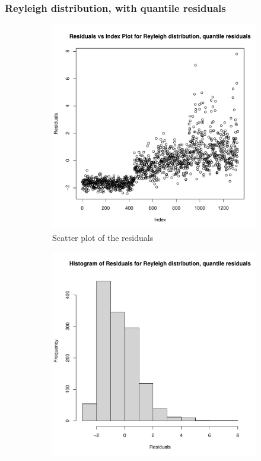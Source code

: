 \documentclass[12pt,a4paper,twoside]{article}
\begin{document}
\subsubsection{Reyleigh distribution, with quantile residuals}
\label{sssec:reyleighquantile}
\begin{figure}[!ht]
    \begin{subfigure}{.45\textwidth}
        \centering
        \includegraphics[width=\linewidth]{img/reyleigh_residuals_quantile.pdf}
        \caption{Scatter plot of the residuals}
        \label{fig:reyleighquantilescatter}
    \end{subfigure}
    \begin{subfigure}{.45\textwidth}
        \centering
        \includegraphics[width=\linewidth]{img/reyleigh_residuals_quantile_hist.pdf}

\end{subfigure}
\end{figure}
\end{document}
